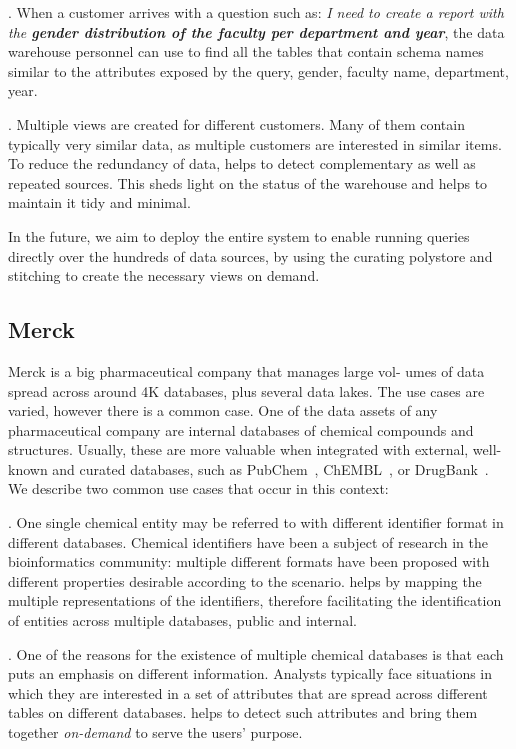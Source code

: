 . When a customer arrives with a question such as: \emph{I need to create a report with the \textbf{gender distribution of the faculty per department and year}}, the data warehouse personnel can use \dcv to find all the tables that contain schema names similar to the attributes exposed by the query, \eg gender, faculty name, department, year.

. Multiple views are created for different customers. Many of them contain typically very similar data, as multiple customers are interested in similar items. To reduce the redundancy of data, \dcv helps to detect complementary as well as repeated sources. This sheds light on the status of the warehouse and helps to maintain it tidy and minimal.

In the future, we aim to deploy the entire \dcv system to enable running queries directly over the hundreds of data sources, by using the curating polystore and stitching to create the necessary views on demand. 

\subsection{Merck}


Merck is a big pharmaceutical company that manages large vol- umes of data spread across around 4K databases, plus several data lakes. The use cases are varied, however there is a common case. One of the data assets of any pharmaceutical company are internal databases of chemical compounds and structures. Usually, these are more valuable when integrated with external, well-known and curated databases, such as PubChem~\cite{pubchem}, ChEMBL~\cite{ChEMBL}, or DrugBank~\cite{DrugBank}. We describe two common use cases that occur in this context:


. One single chemical entity may be referred to with different identifier format in different databases. Chemical identifiers have been a subject of research in the bioinformatics community: multiple different formats have been proposed with different properties desirable according to the scenario. \dcv helps by mapping the multiple representations of the identifiers, therefore facilitating the identification of entities across multiple databases, public and internal.



. One of the reasons for the existence of multiple chemical databases is that each puts an emphasis on different information. Analysts typically face situations in which they are interested in a set of attributes that are spread across different tables on different databases. \dcv helps to detect such attributes and bring them together \emph{on-demand}  to serve the users' purpose.

